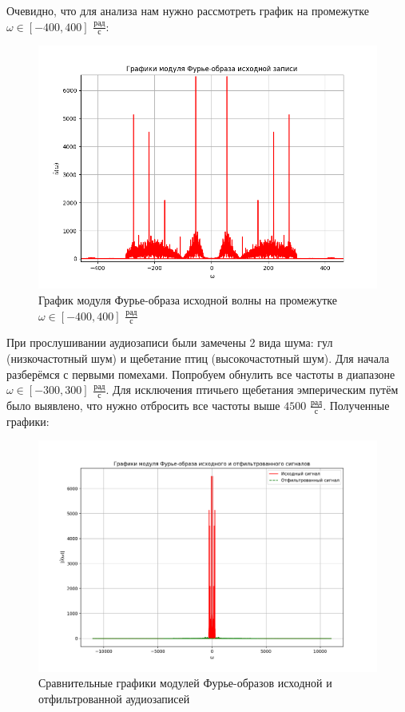 \clearpage

Очевидно, что для анализа нам нужно рассмотреть график на промежутке $\omega \in [-400, 400]$ $\frac{\text{рад}}{\text{с}}$:

\begin{figure}[ht!]
    \centering
    \includegraphics[width=\textwidth]{media/2 task/Image_CLose.png}
    \caption{График модуля Фурье-образа исходной волны на промежутке $\omega \in [-400, 400]$ $\frac{\text{рад}}{\text{с}}$}
    \label{fig:four_orig_detailed_wave}
\end{figure}

При прослушивании аудиозаписи были замечены 2 вида шума: гул (низкочастотный шум) и щебетание птиц (высокочастотный шум). Для начала разберёмся с первыми помехами. Попробуем обнулить все частоты в диапазоне $\omega \in [-300, 300]$ $\frac{\text{рад}}{\text{с}}$. Для исключения птичьего щебетания эмперическим путём было выявлено, что нужно отбросить все частоты выше $4500$ $\frac{\text{рад}}{\text{с}}$. Полученные графики:

\begin{figure}[ht!]
    \centering
    \includegraphics[width=\textwidth]{media/2 task/Images_Comparison.png}
    \caption{Сравнительные графики модулей Фурье-образов исходной и отфильтрованной аудиозаписей}
    \label{fig:fourc_orig_wave}
\end{figure}

